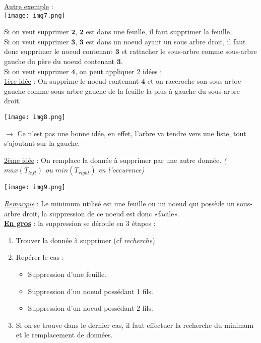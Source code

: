 \documentclass{article}
\begin{document}
\noindent \underline{Autre exemple} : \\

\texttt{[image: img7.png]}

\noindent Si on veut supprimer $\mathbf{2}$, $\mathbf{2}$ est dans une feuille, il faut supprimer la feuille. \\
Si on veut supprimer $\mathbf{3}$, $\mathbf{3}$ est dans un noeud ayant un sous arbre droit, il faut donc supprimer le noeud
contenant $\mathbf{3}$ et rattacher le sous-arbre comme sous-arbre gauche du père du noeud contenant $\mathbf{3}$.\\
Si on veut supprimer $\mathbf{4}$, on peut appliquer 2 idées : \\

\underline{1ère idée} : On supprime le noeud contenant $\mathbf{4}$ et on raccroche son sous-arbre gauche comme sous-arbre 
gauche de la feuille la plus à gauche du sous-arbre droit.

\texttt{[image: img8.png]}

$\rightarrow$ Ce n'est pas une bonne idée, en effet, l'arbre va tendre vers une liste, tout s'ajoutant sur la gauche.

\underline{2ème idée} : On remplace la donnée à supprimer par une autre donnée. \textit{($max(T_{left})$ ou $min(T_{right})$
en l'occurence)}

\texttt{[image: img9.png]}

\textit{\underline{Remarque}} : Le minimum utilisé est une feuille ou un noeud qui possède un sous-arbre droit, la 
suppression de ce noeud est donc «facile». \\

\noindent\underline{\textbf{En gros}} : la suppression se déroule en 3 étapes :
\begin{enumerate}
\item Trouver la donnée à supprimer (cf \textit{recherche})
\item Repérer le cas :
  \begin{itemize}
   \item Suppression d'une feuille.
   \item Suppression d'un noeud possédant 1 fils.
   \item Suppression d'un noeud possédant 2 fils.
  \end{itemize}
\item Si on se trouve dans le dernier cas, il faut effectuer la recherche du minimum et le remplacement de données.
\end{enumerate}
\end{document}
